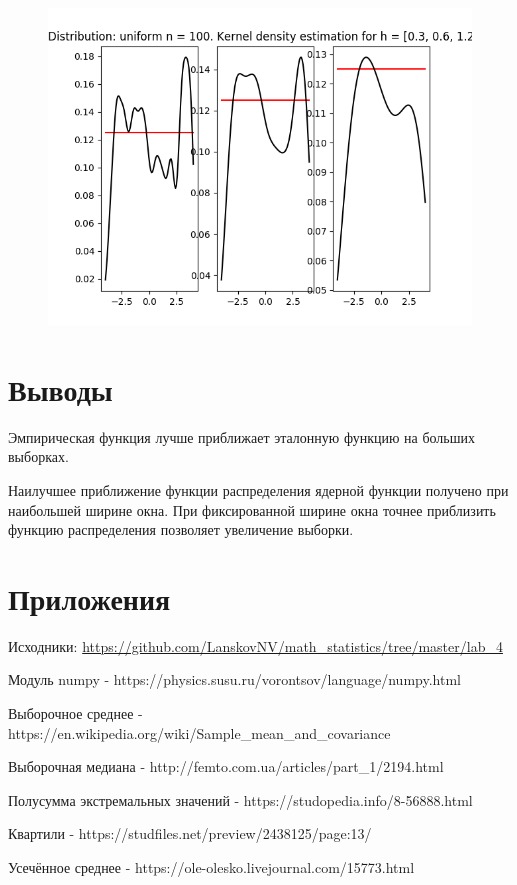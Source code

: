\documentclass[12pt]{article}
\begin{document}
\begin{center}
\begin{figure}[H]
\includegraphics[width=\textwidth]{kernel/d_uniform100.png}
\end{figure}
\end{center}


\section{Выводы}
Эмпирическая функция лучше приближает эталонную функцию на больших выборках.

Наилучшее приближение функции распределения ядерной функции получено при наибольшей ширине окна. При фиксированной ширине окна точнее приблизить функцию распределения позволяет увеличение выборки.

\section{Приложения}

Исходники: \url{https://github.com/LanskovNV/math_statistics/tree/master/lab_4}

\newpage

\begin{thebibliography}{}
      Модуль numpy  -  https://physics.susu.ru/vorontsov/language/numpy.html
    
    Выборочное среднее  -  https://en.wikipedia.org/wiki/Sample\_mean\_and\_covariance
    
    Выборочная медиана  -  http://femto.com.ua/articles/part\_1/2194.html
    
    Полусумма экстремальных значений  -  https://studopedia.info/8-56888.html
    
    Квартили  -  https://studfiles.net/preview/2438125/page:13/
    
      Усечённое среднее  -  https://ole-olesko.livejournal.com/15773.html
\end{thebibliography}
\end{document}
